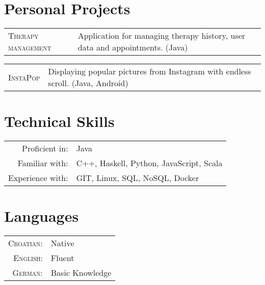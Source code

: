 \documentclass[a4paper,10pt]{article} %
\begin{document}
\section{Personal Projects}

\begin{tabular}{l|p{11cm}}
\textsc{Therapy management} &
\footnotesize{Application for managing therapy history, user data and appointments. (Java)}\\
\end{tabular}

\begin{tabular}{l|p{11cm}}
\textsc{InstaPop} &
\footnotesize{Displaying popular pictures from Instagram with endless scroll. (Java, Android)}\\
\end{tabular}

\vspace{5mm}


\section{Technical Skills}

\begin{tabular}{rl}
    Proficient in:   &  Java \\
    Familiar with:   &  C++, Haskell, Python, JavaScript, Scala \\
    Experience with: &  GIT, Linux, SQL, NoSQL, Docker \\
\end{tabular}

\vspace{5mm}

\section{Languages}

\begin{tabular}{rl}
  \textsc{Croatian: } &  Native \\
  \textsc{English: }  &  Fluent \\
  \textsc{German: }   &  Basic Knowledge \\
\end{tabular}
\end{document}
